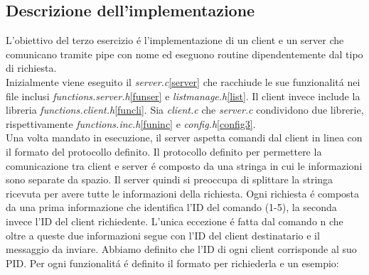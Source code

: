 \documentclass[a4paper]{article}
\begin{document}
\subsection{Descrizione dell'implementazione}
L’obiettivo del terzo esercizio \'e l’implementazione di un client e un server che comunicano tramite pipe con nome ed eseguono routine dipendentemente dal tipo di richiesta.\\
Inizialmente viene eseguito il \textit{server.c}\ref{server} che racchiude le sue funzionalit\'a nei file inclusi \textit{functions.server.h}\ref{funser} e \textit{listmanage.h}\ref{list}. Il client invece include la libreria \textit{functions.client.h}\ref{funcli}.
Sia \textit{client.c} che \textit{server.c} condividono due librerie, rispettivamente \textit{functions.inc.h}\ref{funinc} e \textit{config.h}\ref{config3}.\\
Una volta mandato in esecuzione, il server aspetta comandi dal client in linea con il formato del protocollo definito.
Il protocollo definito per permettere la comunicazione tra client e server  \'e composto da una stringa in cui le informazioni sono separate da spazio. Il server quindi si preoccupa di splittare la stringa ricevuta per avere tutte le informazioni della richiesta. Ogni richiesta \'e composta da una prima informazione che identifica l’ID del comando (1-5), la seconda invece l’ID del client richiedente.
L’unica eccezione \'e fatta dal comando n  che oltre a queste due informazioni segue con l’ID del client destinatario e il messaggio da inviare.
Abbiamo definito che l’ID di ogni client corrisponde al suo PID.
Per ogni funzionalit\'a \'e definito il formato per richiederla e un esempio:
\end{document}
